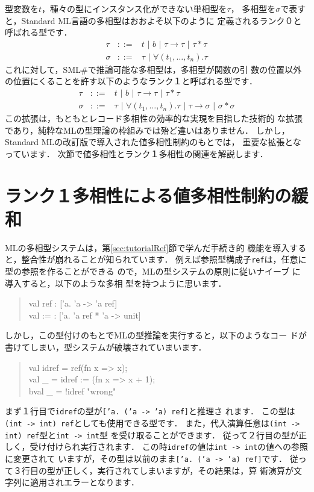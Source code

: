 \documentclass{jbook}
\newcommand{\smlsharp}{SML\#}
\newcommand{\func}{\rightarrow}
\newcommand{\vbar}{\mbox{\ |\ }}
\newenvironment{program}{\begin{tt}\begin{quote}}{\end{quote}\end{tt}}
\begin{document}
	型変数を$t$，種々の型にインスタンス化ができない単相型を$\tau$，
多相型を$\sigma$で表すと，Standard ML言語の多相型はおおよそ以下のように
定義されるランク０と呼ばれる型です．
\begin{eqnarray*}
\tau &::=& t \vbar b \vbar \tau \func \tau \vbar \tau * \tau
\\
\sigma &::=& \tau \vbar \forall (t_1,\ldots,t_n).\tau
\end{eqnarray*}
	これに対して，\smlsharp{}で推論可能な多相型は，多相型が関数の引
数の位置以外の位置にくることを許す以下のようなランク１と呼ばれる型です．
\begin{eqnarray*}
\tau &::=& t \vbar b \vbar \tau \func \tau \vbar \tau * \tau
\\
\sigma &::=& \tau \vbar \forall (t_1,\ldots,t_n).\tau 
\vbar \tau \func \sigma
\vbar \sigma * \sigma 
\end{eqnarray*}
	この拡張は，もともとレコード多相性の効率的な実現を目指した技術的
な拡張であり，純粋なMLの型理論の枠組みでは殆ど違いはありません．
	しかし，Standard MLの改訂版で導入された値多相性制約のもとでは，
重要な拡張となっています．
	次節で値多相性とランク１多相性の関連を解説します．

\section{ランク１多相性による値多相性制約の緩和}
\label{sec:extensionValuerestriction}

	MLの多相型システムは，第\ref{sec:tutorialRef}節で学んだ手続き的
機能を導入すると，整合性が崩れることが知られています．
	例えば参照型構成子{\tt ref}は，任意に型の参照を作ることができる
ので，MLの型システムの原則に従いナイーブ に導入すると，以下のような多相
型を持つように思います．
\begin{program}
val ref : ['a. 'a -> 'a ref]\\
val := :  ['a. 'a ref * 'a -> unit]
\end{program}
	しかし，この型付けのもとでMLの型推論を実行すると，以下のようなコー
ドが書けてしまい，型システムが破壊されていまいます．
\begin{program}
val idref = ref(fn x => x);\\
val \_ = idref := (fn x => x + 1);\\
bval \_ = !idref "wrong"
\end{program}
	まず１行目で{\tt idref}の型が{\tt ['a. ('a -> 'a) ref]}と推理さ
れます．
	この型は{\tt (int -> int) ref}としても使用できる型です．
	また，代入演算任意は{\tt (int -> int) ref}型と{\tt int -> int}型
を受け取ることができます．
	従って２行目の型が正しく，受け付けられ実行されます．
	この時{\tt idref}の値は{\tt int -> int}の値への参照に変更されて
いますが，その型は以前のまま{\tt ['a. ('a -> 'a) ref]}です．
	従って３行目の型が正しく，実行されてしまいますが，その結果は，算
術演算が文字列に適用されエラーとなります．
\end{document}
